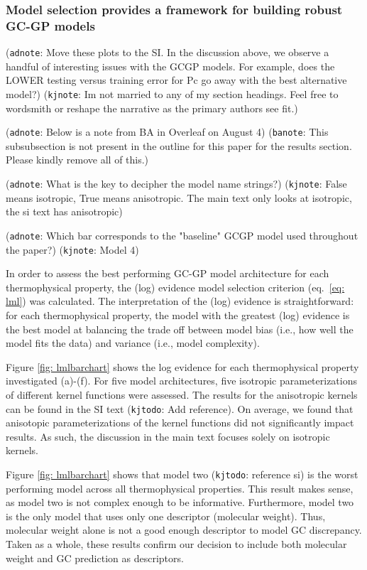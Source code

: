 \documentclass[journal=jacsat,manuscript=article]{achemso}
\newcommand{\kjnote}[1]{{\color{Blue} (\texttt{kjnote}: #1)}}
\newcommand{\kjtodo}[1]{{\color{Red} (\texttt{kjtodo}: #1)}}
\newcommand{\adnote}[1]{{\color{OliveGreen} (\texttt{adnote}: #1)}}
\newcommand{\banote}[1]{{\color{Salmon} (\texttt{banote}: #1)}}
\begin{document}
\subsubsection{Model selection provides a framework for building robust GC-GP models}
\adnote{Move these plots to the SI. In the discussion above, we observe a handful of interesting issues with the GCGP models. For example, does the LOWER testing versus training error for Pc go away with the best alternative model?}
\kjnote{Im not married to any of my section headings. Feel free to wordsmith or reshape the narrative as the primary authors see fit.}

\adnote{Below is a note from BA in Overleaf on August 4}
\banote{This subsubsection is not present in the outline for this paper for the results section. Please kindly remove all of this.}

\adnote{What is the key to decipher the model name strings?} \kjnote{False means isotropic, True means anisotropic. The main text only looks at isotropic, the si text has anisotropic}

\adnote{Which bar corresponds to the "baseline" GCGP model used throughout the paper?} \kjnote{Model 4}

In order to assess the best performing GC-GP model architecture for each thermophysical property, the (log) evidence model selection criterion (eq.~\eqref{eq: lml}) was calculated. The interpretation of the (log) evidence is straightforward: for each thermophysical property, the model with the greatest (log) evidence is the best model at balancing the trade off between model bias (i.e., how well the model fits the data) and variance (i.e., model complexity). 

Figure \ref{fig: lmlbarchart} shows the log evidence for each thermophysical property investigated (a)-(f). For five model architectures, five isotropic parameterizations of different kernel functions were assessed. The results for the anisotropic kernels can be found in the SI text \kjtodo{Add  reference}. On average, we found that anisotopic parameterizations of the kernel functions did not significantly impact results. As such, the discussion in the main text focuses solely on isotropic kernels. 

Figure \ref{fig: lmlbarchart} shows that model two \kjtodo{reference si} is the worst performing model across all thermophysical properties. This result makes sense, as model two is not complex enough to be informative. Furthermore, model two is the only model that uses only one descriptor (molecular weight). Thus, molecular weight alone is not a good enough descriptor to model GC discrepancy. Taken as a whole, these results confirm our decision to include both molecular weight and GC prediction as descriptors.
\end{document}
